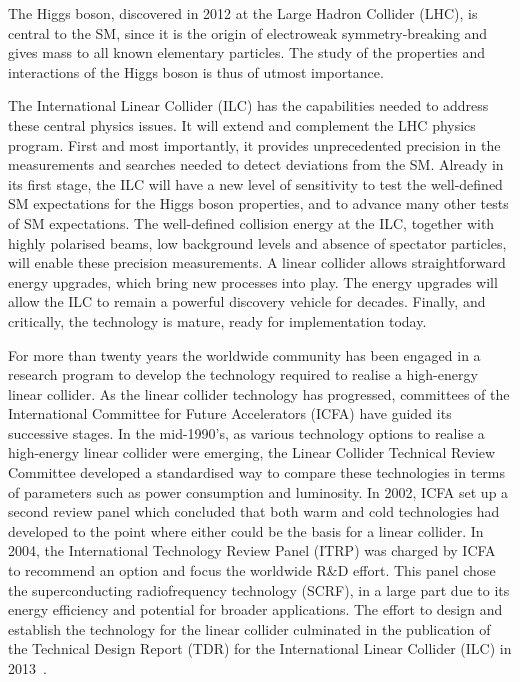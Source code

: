 \documentclass[%
 reprint,
 floatfix,
 amsmath,amssymb,
 aps,
]{revtex4-1}
\begin{document}
The Higgs boson,
 discovered in 2012 at the Large Hadron Collider (LHC), is
central to the SM,  since it is the  origin of 
 electroweak symmetry-breaking and gives mass to all 
known elementary particles.   The study of the properties and
interactions of the Higgs boson is thus of utmost importance.

The International Linear Collider (ILC) has the capabilities needed
to address these central physics issues.  It will extend and complement the LHC physics program. First and most importantly, it provides
unprecedented precision in the measurements and searches needed to detect deviations from the SM.
Already in its first stage, the 
ILC will have a new level of sensitivity to test the well-defined SM
expectations for the Higgs boson properties, and to advance many other 
tests of SM expectations.  
The well-defined collision energy at the ILC, together with highly polarised beams, low background levels and absence of spectator particles, will enable these precision measurements.
    A linear collider allows straightforward energy
upgrades, which bring new processes into play. 
The energy upgrades will allow the ILC to remain a powerful 
discovery vehicle for decades. 
Finally, and critically, the technology is mature, 
ready for implementation today.

For more than twenty years the worldwide community has been engaged in
a research program to develop the technology required to realise a
high-energy linear collider.  As the linear collider technology has
progressed,
committees of   the International Committee for Future Accelerators
(ICFA) have  guided its successive stages.
In the mid-1990's, as various technology options to
realise a high-energy linear collider were emerging, the 
Linear Collider Technical Review Committee developed a standardised
way to  compare  these  technologies in terms of parameters such as
power consumption and luminosity. In 2002, ICFA set up a second
review panel which concluded that both warm and cold technologies had
developed to the point where either could be the basis for a linear
collider. In 2004, the  International Technology Review Panel
(ITRP) was charged by ICFA to recommend an option and focus the
worldwide R\&D effort.  This panel chose the  superconducting
radiofrequency technology (SCRF), in a large part due to its
energy efficiency and potential for broader applications. 
The effort to design and
establish the technology for the linear collider culminated in the
publication of the Technical Design Report (TDR) for the International
Linear Collider (ILC) in 2013~\cite{Behnke:2013xla}. 
\end{document}
